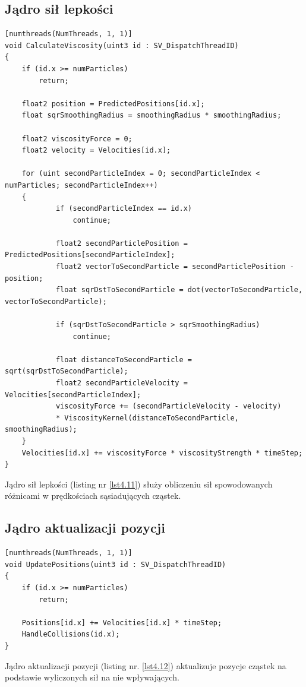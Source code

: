 \documentclass{article}
\begin{document}
\subsection{Jądro sił lepkości}
\begin{lstlisting}[caption=Jądro sił lepkości, label={lst4.11}]
[numthreads(NumThreads, 1, 1)]
void CalculateViscosity(uint3 id : SV_DispatchThreadID)
{
	if (id.x >= numParticles)
		return;
	
	float2 position = PredictedPositions[id.x];
	float sqrSmoothingRadius = smoothingRadius * smoothingRadius;

	float2 viscosityForce = 0;
	float2 velocity = Velocities[id.x];

	for (uint secondParticleIndex = 0; secondParticleIndex < numParticles; secondParticleIndex++)
	{
			if (secondParticleIndex == id.x)
				continue;

			float2 secondParticlePosition = PredictedPositions[secondParticleIndex];
			float2 vectorToSecondParticle = secondParticlePosition - position;
			float sqrDstToSecondParticle = dot(vectorToSecondParticle, vectorToSecondParticle);

			if (sqrDstToSecondParticle > sqrSmoothingRadius)
				continue;

			float distanceToSecondParticle = sqrt(sqrDstToSecondParticle);
			float2 secondParticleVelocity = Velocities[secondParticleIndex];
			viscosityForce += (secondParticleVelocity - velocity) 
            * ViscosityKernel(distanceToSecondParticle, smoothingRadius);
	}
	Velocities[id.x] += viscosityForce * viscosityStrength * timeStep;
}
\end{lstlisting}
\noindent
Jądro sił lepkości (listing nr \ref{lst4.11}) służy obliczeniu sił spowodowanych różnicami w prędkościach sąsiadujących cząstek.\newline
\newpage
\subsection{Jądro aktualizacji pozycji}
\begin{lstlisting}[caption=Jądro aktualizacji pozycji, label={lst4.12}]
[numthreads(NumThreads, 1, 1)]
void UpdatePositions(uint3 id : SV_DispatchThreadID)
{
	if (id.x >= numParticles)
		return;

	Positions[id.x] += Velocities[id.x] * timeStep;
	HandleCollisions(id.x);
}
\end{lstlisting}
\noindent
Jądro aktualizacji pozycji (listing nr. \ref{lst4.12}) aktualizuje pozycje cząstek na podstawie wyliczonych sił na nie wpływających.\newline
\end{document}
